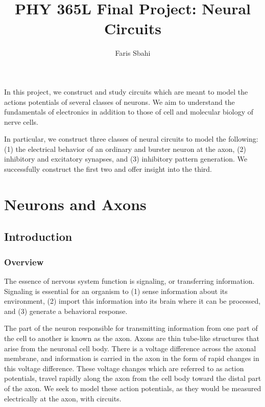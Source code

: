 \documentclass[12]{book}
\title{PHY 365L Final Project: Neural Circuits}
\author{Faris Sbahi}
\newcommand\0{\mathbf{0}}
\newcommand\<{\langle}
\renewcommand\>{\rangle}
\begin{document}
\maketitle


In this project, we construct and study circuits which are meant to model the actions potentials of several classes of neurons. We aim to understand the fundamentals of electronics in addition to those of cell and molecular biology of nerve cells.

In particular, we construct three classes of neural circuits to model the following: (1) the electrical behavior of an ordinary and burster neuron at the axon, (2) inhibitory and excitatory synapses, and (3) inhibitory pattern generation. We successfully construct the first two and offer insight into the third.

\chapter{Neurons and Axons}

\section{Introduction}

\subsection{Overview}

The essence of nervous system function is signaling, or transferring information. Signaling is essential for an organism to (1) sense information about its environment, (2) import this information into its brain where it can be processed, and (3) generate a behavioral response.

The part of the neuron responsible for transmitting information from one part of the cell to another is known as the axon. Axons are thin tube-like structures that arise from the neuronal cell body. There is a voltage difference across the axonal membrane, and information is carried in the axon in the form of rapid changes in this voltage difference. These voltage changes which are referred to as action potentials, travel rapidly along the axon from the cell body toward the distal part of the axon. We seek to model these action potentials, as they would be measured electrically at the axon, with circuits.
\end{document}
